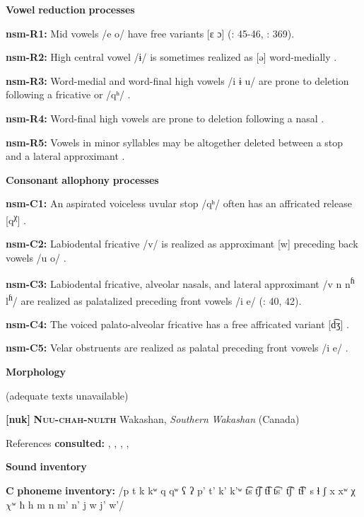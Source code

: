 \textbf{Vowel} \textbf{reduction} \textbf{processes}

\textbf{nsm-R1:} Mid vowels /e o/ have free variants [ɛ ɔ] (\citealt{Teo2009}: 45-46, \citealt{Teo2012}: 369).

\textbf{nsm-R2:} High central vowel /ɨ/ is sometimes realized as [ə] word-medially \citep[45]{Teo2009}.

\textbf{nsm-R3:} Word-medial and word-final high vowels /i ɨ u/ are prone to deletion following a fricative or /qʰ/ \citep[66]{Teo2009}.

\textbf{nsm-R4:} Word-final high vowels are prone to deletion following a nasal \citep[369]{Teo2012}.

\textbf{nsm-R5:} Vowels in minor syllables may be altogether deleted between a stop and a lateral approximant \citep[370]{Teo2012}.

\textbf{Consonant} \textbf{allophony} \textbf{processes}

\textbf{nsm-C1:} An aspirated voiceless uvular stop /qʰ/ often has an affricated release [q\textsuperscript{χ}] \citep[39]{Teo2009}.

\textbf{nsm-C2:} Labiodental fricative /v/ is realized as approximant [w] preceding back vowels /u o/ \citep[39]{Teo2009}.

\textbf{nsm-C3:} Labiodental fricative, alveolar nasals, and lateral approximant /v n n\textsuperscript{ɦ} l\textsuperscript{ɦ}/ are realized as palatalized preceding front vowels /i e/ (\citealt{Teo2009}: 40, 42).

\textbf{nsm-C4:} The voiced palato-alveolar fricative has a free affricated variant [d͡ʒ] \citep[40]{Teo2009}.

\textbf{nsm-C5:} Velar obstruents are realized as palatal preceding front vowels /i e/ \citep[368]{Teo2012}.

\textbf{Morphology}

(adequate texts unavailable)

\textbf{[nuk]}   \textbf{\textsc{Nuu-chah-nulth}}  Wakashan, \textit{Southern} \textit{Wakashan} (Canada)

References \textbf{consulted:} \citet{CarlsonEtAl2001}, \citet{Davidson2002}, \citet{Kim2003}, \citet{Rose1981}, \citet{Stonham1999}

\textbf{Sound} \textbf{inventory}

\textbf{C} \textbf{phoneme} \textbf{inventory:} /p t k kʷ q qʷ ʕ ʔ p’ t’ k’ k’ʷ t͡s t͡ʃ t͡ɬ t͡s’ t͡ʃ’ t͡ɬ’ s ɬ ʃ x xʷ χ $\chi ʷ$ ħ h m n m’ n’ j w j’ w’/

